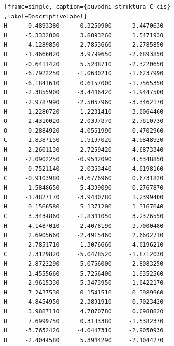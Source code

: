 \documentclass[
  digital, %
  table,   %
  lof,     %
  lot,     %
  oneside,
]{fithesis3}
\begin{document}
\begin{lstlisting}[frame=single, caption={puvodni struktura C cis} ,label=DescriptiveLabel]
H      0.4893380      0.3250900     -3.4470630
H     -5.3332800      3.8893260      1.5471930
H     -4.1289850      2.7853660      2.2785850
H     -1.4666020      3.9799650     -2.6893850
H     -0.6411420      5.5208710     -2.3220650
H     -6.7922250     -1.0600210     -1.6237990
H     -6.1841610      0.6157000     -1.7565350
H     -2.3855900     -3.4446420     -1.9447500
H     -2.9787990     -2.5067960     -3.3462170
H      1.2280720     -1.2231410     -3.0064460
O     -2.4310020     -2.0397870      2.7810730
O     -0.2884920     -4.0561990     -0.4702960
C     -1.8387150     -1.9197020      4.0848920
H     -2.2601130     -2.7259420      4.6873340
H     -2.0902250     -0.9542090      4.5348850
H     -0.7521140     -2.0363440      4.0198160
C     -0.9103980     -4.6776960      0.6731820
H     -1.5848650     -5.4399090      0.2767870
H     -1.4827170     -3.9400780      1.2399400
H     -0.1566580     -5.1371200      1.3167040
C      3.3434860     -1.8341050      3.2376550
H      4.1487010     -2.4078190      3.7000480
H      2.6905660     -2.4915460      2.6602710
H      2.7851710     -1.3076660      4.0196210
C      2.3129820     -5.0478520     -1.8712030
H      2.8722290     -5.0766000     -2.8083250
H      1.4555660     -5.7266400     -1.9352560
H      2.9615330     -5.3473950     -1.0422170
H     -7.2437530      0.1541510     -0.3989960
H     -4.8454950      2.3891910      0.7023420
H      3.9887110      4.7870780      0.0988820
H      7.6999750      0.3183380     -1.5382370
H     -3.7652420     -4.0447310     -2.9050930
H     -2.4044580      5.3944290     -2.1044270

  \end{lstlisting}
 \newpage
\end{document}
